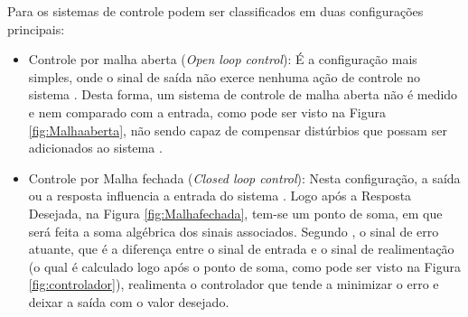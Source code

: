 Para  os sistemas de controle podem ser classificados em duas configurações principais:
\begin{itemize}
 \item Controle por malha aberta (\textit{Open loop control}): É a configuração mais simples, onde o sinal 
 de saída não exerce nenhuma ação de controle no sistema \cite{ogata}. Desta forma, um sistema de controle de malha aberta 
 não é medido e nem comparado com a entrada, como pode ser visto na Figura \ref{fig:Malhaaberta}, não sendo capaz de compensar 
 distúrbios que possam ser adicionados ao sistema \cite{nise}.
 
 \item Controle por Malha fechada (\textit{Closed loop control}): Nesta configuração, a saída ou a resposta influencia a entrada do 
 sistema \cite{controle}. Logo após a Resposta Desejada, na Figura \ref{fig:Malhafechada}, tem-se um ponto de soma, em que será feita 
 a soma algébrica dos sinais associados. %
 Segundo , o sinal de erro atuante, que é a diferença entre o sinal de entrada e o sinal de realimentação (o qual é 
 calculado logo após o ponto de soma, como pode ser visto na Figura \ref{fig:controlador}), 
 realimenta o controlador que tende a minimizar o erro e deixar a saída com o valor desejado.
\end{itemize}


